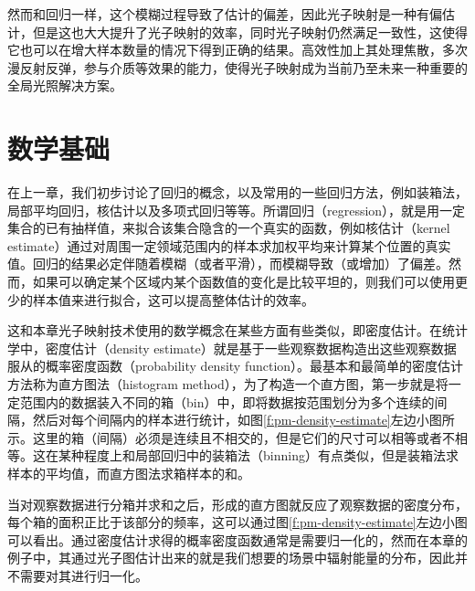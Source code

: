 然而和回归一样，这个模糊过程导致了估计的偏差，因此光子映射是一种有偏估计，但是这也大大提升了光子映射的效率，同时光子映射仍然满足一致性，这使得它也可以在增大样本数量的情况下得到正确的结果。高效性加上其处理焦散，多次漫反射反弹，参与介质等效果的能力，使得光子映射成为当前乃至未来一种重要的全局光照解决方案。





\section{数学基础}
在上一章，我们初步讨论了回归的概念，以及常用的一些回归方法，例如装箱法，局部平均回归，核估计以及多项式回归等等。所谓回归（regression），就是用一定集合的已有抽样值，来拟合该集合隐含的一个真实的函数，例如核估计（kernel estimate）通过对周围一定领域范围内的样本求加权平均来计算某个位置的真实值。回归的结果必定伴随着模糊（或者平滑），而模糊导致（或增加）了偏差。然而，如果可以确定某个区域内某个函数值的变化是比较平坦的，则我们可以使用更少的样本值来进行拟合，这可以提高整体估计的效率。

这和本章光子映射技术使用的数学概念在某些方面有些类似，即密度估计。在统计学中，密度估计（density estimate）就是基于一些观察数据构造出这些观察数据服从的概率密度函数（probability density function）。最基本和最简单的密度估计方法称为直方图法（histogram method），为了构造一个直方图，第一步就是将一定范围内的数据装入不同的箱（bin）中，即将数据按范围划分为多个连续的间隔，然后对每个间隔内的样本进行统计，如图\ref{f:pm-density-estimate}左边小图所示。这里的箱（间隔）必须是连续且不相交的，但是它们的尺寸可以相等或者不相等。这在某种程度上和局部回归中的装箱法（binning）有点类似，但是装箱法求样本的平均值，而直方图法求箱样本的和。

当对观察数据进行分箱并求和之后，形成的直方图就反应了观察数据的密度分布，每个箱的面积正比于该部分的频率，这可以通过图\ref{f:pm-density-estimate}左边小图可以看出。通过密度估计求得的概率密度函数通常是需要归一化的，然而在本章的例子中，其通过光子图估计出来的就是我们想要的场景中辐射能量的分布，因此并不需要对其进行归一化。

